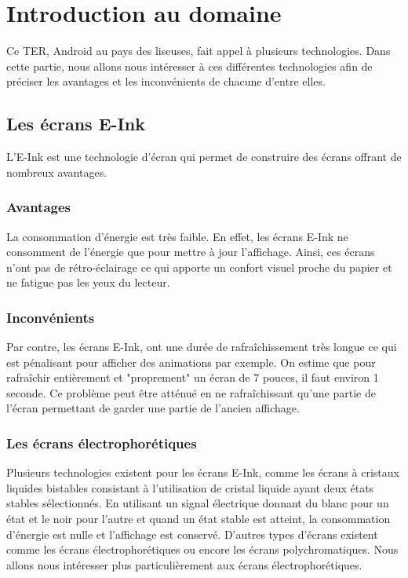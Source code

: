 \chapter{Introduction au domaine}
Ce TER, Android au pays des liseuses, fait appel à plusieurs technologies. Dans cette partie, nous allons nous intéresser à ces différentes technologies afin de préciser les avantages et les inconvénients de chacune d'entre elles.

\section{Les écrans E-Ink}
L'E-Ink est une technologie d'écran qui permet de construire des écrans offrant de nombreux avantages.

\subsection{Avantages}
La consommation d'énergie est très faible. En effet, les écrans E-Ink ne consomment de l'énergie que pour mettre à jour l'affichage. Ainsi, ces écrans n'ont pas de rétro-éclairage ce qui apporte un confort visuel proche du papier et ne fatigue pas les yeux du lecteur. 

\subsection{Inconvénients}
Par contre, les écrans E-Ink, ont une durée de rafraîchissement très longue ce qui est pénalisant pour afficher des animations par exemple. On estime que pour rafraîchir entièrement et "proprement" un écran de 7 pouces, il faut environ 1 seconde. Ce problème peut être atténué en ne rafraîchissant qu'une partie de l'écran permettant de garder une partie de l'ancien affichage. 

\subsection{Les écrans électrophorétiques}
Plusieurs technologies existent pour les écrans E-Ink, comme les écrans à cristaux liquides bistables consistant à l'utilisation de cristal liquide ayant deux états stables sélectionnés. En utilisant un signal électrique donnant du blanc pour un état et le noir pour l'autre et quand un état stable est atteint, la consommation d'énergie est nulle et l'affichage est conservé. D'autres types d'écrans existent comme les écrans électrophorétiques ou encore les écrans polychromatiques. Nous allons nous intéresser plus particulièrement aux écrans électrophorétiques.\\

